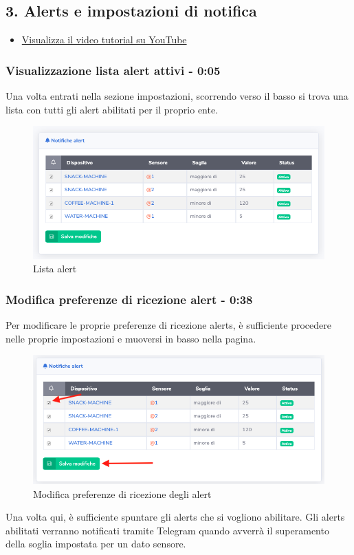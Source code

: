\newpage \subsection{3. Alerts e impostazioni di notifica}

	\begin{itemize}
		\item \href{https://www.youtube.com/watch?v=PjySMOLCtMA&list=PLPKYjnuIh1FA3b3jn_bwY_ztYzaFn2mIT&index=6}{Visualizza il video tutorial su YouTube} 
	\end{itemize}

	\subsubsection{Visualizzazione lista alert attivi - 0:05}

		Una volta entrati nella sezione impostazioni, scorrendo verso il basso si trova una lista con tutti gli alert abilitati per il proprio ente.
		\begin{figure}[H]
		\centering
		\includegraphics[scale=0.600]{res/images/membro/listaAlert.png}
		\caption{Lista alert}
	\end{figure}

	\subsubsection{Modifica preferenze di ricezione alert - 0:38}
		Per modificare le proprie preferenze di ricezione alerts, è sufficiente procedere nelle proprie impostazioni e muoversi in basso nella pagina.
		\begin{figure}[H]
		\centering
		\includegraphics[scale=0.600]{res/images/membro/attDisattAlert.png}
		\caption{Modifica preferenze di ricezione degli alert}
	\end{figure}
		Una volta qui, è sufficiente spuntare gli alerts che si vogliono abilitare. Gli alerts abilitati verranno notificati tramite Telegram quando avverrà il superamento della soglia impostata per un dato sensore.


